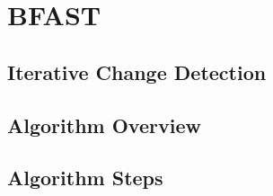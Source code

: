 \documentclass[main.tex]{subfiles}
\begin{document}
\chapter{BFAST}
\label{chap:bfast}


\section{Iterative Change Detection}
\label{sec:iterative_change_detection}
\section{Algorithm Overview}
\label{sec:bfast_algorithm_overview}
\section{Algorithm Steps}
\label{sec:algorithm_steps}

\biblio
\end{document}
